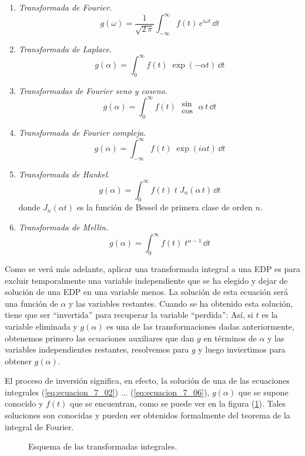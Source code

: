\begin{enumerate}
\item \emph{Transformada de Fourier.}
\begin{equation}
g (\omega) = \dfrac{1}{\sqrt{2 \, \pi}} \int_{-\infty}^{\infty} f(t) \, e^{i \omega t} \, \dd t
\label{eq:ecuacion_07_01}
\end{equation}
\item \emph{Transformada de Laplace.}
\begin{equation}
g (\alpha)= \int_{0}^{\infty} f(t) \; \exp(-\alpha t) \, \dd t
\label{eq:ecuacion_7_02}
\end{equation}
\item \emph{Transformadas de Fourier seno y coseno.}
\begin{equation}
g (\alpha)= \int_{0}^{\infty} f(t) \; \substack{ \textstyle \sin \\[0.5em] \textstyle \cos} \; \alpha \, t \,  \dd t
\label{eq:ecuacion_7_03}
\end{equation}
\item \emph{Transformada de Fourier compleja.}
\begin{equation}
g (\alpha)= \int_{-\infty}^{\infty} f(t) \; \exp(i \alpha t) \, \dd t
\label{eq:ecuacion_7_04}
\end{equation}
\item \emph{Transformada de Hankel.}
\begin{equation}
g (\alpha)= \int_{0}^{\infty} f(t) \; t \; J_{n} (\alpha \, t) \, \dd t
\label{eq:ecuacion_7_05}
\end{equation}
donde $J_{n}(\alpha t)$ es la función de Bessel de primera clase de orden $n$.
\item \emph{Transformada de Mellin.}
\begin{equation}
g (\alpha)= \int_{0}^{\infty} f(t) \; t^{\alpha-1} \, \dd t
\label{eq:ecuacion_7_06}
\end{equation}
\end{enumerate}
Como se verá más adelante, aplicar una transformada integral a una EDP es para excluir temporalmente una variable independiente que se ha elegido y dejar de solución de una EDP en una variable menos. La solución de esta ecuación será una función de $\alpha$ y las variables restantes. Cuando se ha obtenido esta solución, tiene que ser \enquote{invertida} para recuperar la variable \enquote{perdida}: Así, si $t$ es la variable eliminada y $g (\alpha)$ es una de las transformaciones dadas anteriormente, obtenemos primero las ecuaciones auxiliares que dan $g$ en términos de $\alpha$ y las variables independientes restantes, resolvemos para $g$ y luego inviertimos para obtener $g(\alpha)$.
\par
El proceso de inversión significa, en efecto, la solución de una de las ecuaciones integrales (\ref{eq:ecuacion_7_02}) $\ldots$ (\ref{eq:ecuacion_7_06}), $g (\alpha)$ que se supone conocido y $f(t)$ que se encuentran, como se puede ver en la figura (\ref{fig:figura_01}). Tales soluciones son conocidas y pueden ser obtenidos formalmente del teorema de la integral de Fourier.
\begin{figure}[H]
\centering

\caption{Esquema de las transformadas integrales.}
\label{fig:figura_01}
\end{figure}
